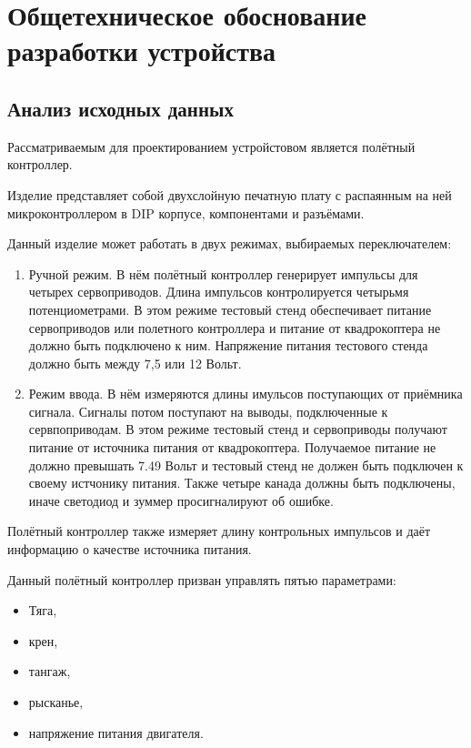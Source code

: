 \section{Общетехническое обоснование разработки устройства}


\subsection{Анализ исходных данных}

Рассматриваемым для проектированием устройстовом является полётный
контроллер.

Изделие представляет собой двухслойную печатную плату с распаянным на
ней микроконтроллером в DIP корпусе, компонентами и
разъёмами.


Данный изделие может работать в двух режимах, выбираемых
переключателем:

\begin{enumerate} 
  
\item Ручной режим. В нём полётный контроллер генерирует импульсы для
четырех сервоприводов. Длина импульсов контролируется четырьмя
потенциометрами. В этом режиме тестовый стенд обеспечивает питание
сервоприводов или полетного контроллера и питание от квадрокоптера не
должно быть подключено к ним. Напряжение питания тестового стенда
должно быть между 7,5 или 12 Вольт.
  
\item Режим ввода. В нём измеряются длины имульсов поступающих от
приёмника сигнала. Сигналы потом поступают на выводы, подключенные к
сервпоприводам.  В этом режиме тестовый стенд и сервоприводы получают
питание от источника питания от квадрокоптера. Получаемое питание не
должно превышать 7.49 Вольт и тестовый стенд не должен быть подключен
к своему истчонику питания. Также четыре канада должны быть
подключены, иначе светодиод и зуммер просигналируют об ошибке.

\end{enumerate}

Полётный контроллер также измеряет длину контрольных импульсов и даёт
информацию о качестве источника питания.

Данный полётный контроллер призван управлять пятью параметрами:
\begin{itemize}
\item Тяга,
\item крен,
\item тангаж,
\item рысканье,
\item напряжение питания двигателя.
\end{itemize}

